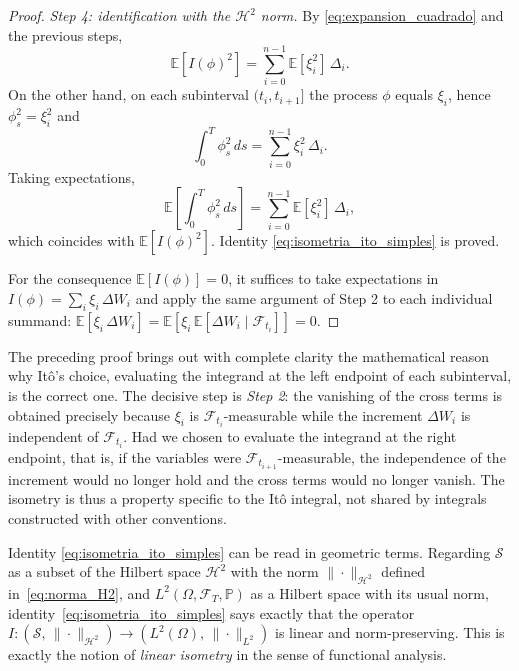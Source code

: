 \documentclass[11pt,a4paper,oneside]{report}
\theoremstyle{plain}
\theoremstyle{definition}
\theoremstyle{remark}
\newcommand{\E}{\mathbb{E}}
\newcommand{\PP}{\mathbb{P}}
\newcommand{\F}{\mathcal{F}}
\newcommand{\1}{\mathbf{1}}
\begin{document}
\begin{proof}
\emph{Step 4: identification with the $\mathcal{H}^2$ norm.} By
\eqref{eq:expansion_cuadrado} and the previous steps,
\begin{equation*}
  \E[I(\phi)^2] = \sum_{i=0}^{n-1} \E[\xi_i^2]\, \Delta_i.
\end{equation*}
On the other hand, on each subinterval $(t_i, t_{i+1}]$ the process
$\phi$ equals $\xi_i$, hence $\phi_s^2 = \xi_i^2$ and
\begin{equation*}
  \int_0^T \phi_s^2\, ds = \sum_{i=0}^{n-1} \xi_i^2\, \Delta_i.
\end{equation*}
Taking expectations,
\begin{equation*}
  \E\!\left[\int_0^T \phi_s^2\, ds\right]
  = \sum_{i=0}^{n-1} \E[\xi_i^2]\, \Delta_i,
\end{equation*}
which coincides with $\E[I(\phi)^2]$. Identity
\eqref{eq:isometria_ito_simples} is proved.

For the consequence $\E[I(\phi)] = 0$, it suffices to take
expectations in $I(\phi) = \sum_i \xi_i\, \Delta W_i$ and apply the
same argument of Step 2 to each individual summand:
$\E[\xi_i\, \Delta W_i] = \E[\xi_i\, \E[\Delta W_i \mid \F_{t_i}]] = 0$.
\end{proof}

The
preceding proof brings out with complete clarity the mathematical
reason why Itô's choice, evaluating the integrand at the left
endpoint of each subinterval, is the correct one. The decisive step
is \emph{Step 2}: the vanishing of the cross terms is obtained
precisely because $\xi_i$ is $\F_{t_i}$-measurable while the
increment $\Delta W_i$ is independent of $\F_{t_i}$. Had we chosen to
evaluate the integrand at the right endpoint, that is, if the
variables were $\F_{t_{i+1}}$-measurable, the independence of the
increment would no longer hold and the cross terms would no longer
vanish. The isometry is thus a property specific to the Itô integral,
not shared by integrals constructed with other conventions.

Identity
\eqref{eq:isometria_ito_simples} can be read in geometric terms.
Regarding $\mathcal{S}$ as a subset of the Hilbert space
$\mathcal{H}^2$ with the norm $\|\cdot\|_{\mathcal{H}^2}$ defined
in~\eqref{eq:norma_H2}, and $L^2(\Omega, \F_T, \PP)$ as a Hilbert
space with its usual norm, identity~\eqref{eq:isometria_ito_simples}
says exactly that the operator
$I : (\mathcal{S},\, \|\cdot\|_{\mathcal{H}^2}) \to (L^2(\Omega),\, \|\cdot\|_{L^2})$
is linear and norm-preserving. This is exactly the notion of
\emph{linear isometry} in the sense of functional analysis.
\end{document}
